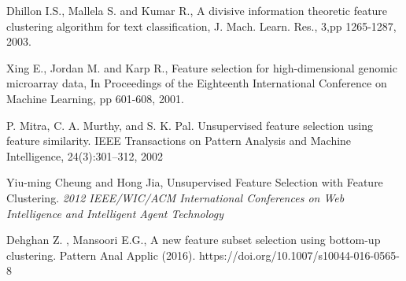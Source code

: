 \documentclass[a4paper,11pt]{article}
\begin{document}
\begin{thebibliography}{}
Dhillon I.S., Mallela S. and Kumar R., A divisive information theoretic feature clustering algorithm for text classification, J. Mach. Learn. Res., 3,pp 1265-1287, 2003.

Xing E., Jordan M. and Karp R., Feature selection for high-dimensional genomic microarray data, In Proceedings of the Eighteenth International Conference on Machine Learning, pp 601-608, 2001.

P. Mitra, C. A. Murthy, and S. K. Pal. Unsupervised feature selection using feature similarity. IEEE Transactions on Pattern Analysis and Machine Intelligence, 24(3):301–312, 2002

Yiu-ming Cheung and Hong Jia, Unsupervised Feature Selection with Feature Clustering. \textit{2012 IEEE/WIC/ACM International Conferences on Web Intelligence and Intelligent Agent Technology}

Dehghan Z. , Mansoori E.G., A new feature subset selection using bottom-up clustering. Pattern Anal Applic (2016). https://doi.org/10.1007/s10044-016-0565-8
\end{thebibliography}
\end{document}
